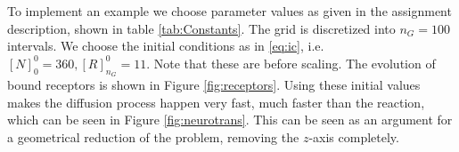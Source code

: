 \documentclass{article}
\begin{document}
To implement an example we choose parameter values as given in the assignment description, shown in table \ref{tab:Constants}.
The grid is discretized into $n_G = 100$ intervals.
We choose the initial conditions as in \eqref{eq:ic}, i.e. $[N]_0^0 = 360, [R]_{n_G}^0 = 11$. Note that these are before scaling.
The evolution of bound receptors is shown in Figure \ref{fig:receptors}.
Using these initial values makes the diffusion process happen very fast, much faster than the reaction, which can be seen in Figure \ref{fig:neurotrans}.
This can be seen as an argument for a geometrical reduction of the problem, removing the $z$-axis completely.



\end{document}
